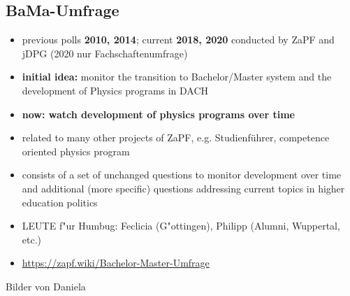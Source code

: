 \documentclass[compress, aspectratio=169]{beamer}
\newcommand{\red}[1]{{\color{ourred} \textbf{#1}}}
\newcommand{\blue}[1]{{\color{ourblue} \textbf{#1}}}
\begin{document}
 \subsection{BaMa-Umfrage}
 \begin{frame}{\insertsubsection}
 	\vspace*{-3mm}
 	\begin{itemize}
 		\item previous polls \blue{2010, 2014}; current \blue{2018, 2020} conducted by ZaPF and jDPG (2020 nur Fachschaftenumfrage)
 		\item \blue{initial idea:} monitor the transition to Bachelor/Master system and the development of Physics programs in DACH
 		\item \red{now: watch development of physics programs over time}
 		\item related to many other projects of ZaPF, e.g. Studienf\"uhrer, competence oriented physics program
 		\pause
 		\item consists of a set of unchanged questions to monitor development over time and additional (more specific) questions addressing current topics in higher education politics
 		\item LEUTE f"ur Humbug: Feclicia (G"ottingen), Philipp (Alumni, Wuppertal, etc.)
 		\item \url{https://zapf.wiki/Bachelor-Master-Umfrage}
 	\end{itemize}
 \end{frame}
 \begin{frame}{\insertsubsection}
 	Bilder von Daniela
 \end{frame}
\end{document}

